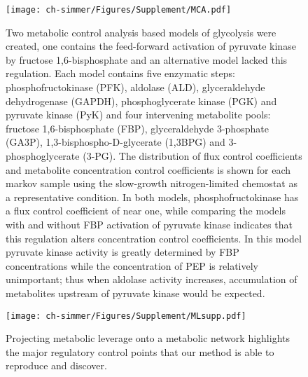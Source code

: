 \begin{figure}[!htb]
\texttt{[image: ch-simmer/Figures/Supplement/MCA.pdf]}
\caption[Two metabolic control analysis based models of glycolysis were created, one contains the feed-forward activation of pyruvate kinase by fructose 1,6-bisphosphate and an alternative model lacked this regulation]{Two metabolic control analysis based models of glycolysis were created, one contains the feed-forward activation of pyruvate kinase by fructose 1,6-bisphosphate and an alternative model lacked this regulation. Each model contains five enzymatic steps: phosphofructokinase (PFK), aldolase (ALD), glyceraldehyde dehydrogenase (GAPDH), phosphoglycerate kinase (PGK) and pyruvate kinase (PyK) and four intervening metabolite pools: fructose 1,6-bisphosphate (FBP), glyceraldehyde 3-phosphate (GA3P), 1,3-bisphospho-D-glycerate (1,3BPG) and 3-phosphoglycerate (3-PG). The distribution of flux control coefficients and metabolite concentration control coefficients is shown for each markov sample using the slow-growth nitrogen-limited chemostat as a representative condition.  In both models, phosphofructokinase has a flux control coefficient of near one, while comparing the models with and without FBP activation of pyruvate kinase indicates that this regulation alters concentration control coefficients. In this model pyruvate kinase activity is greatly determined by FBP concentrations while the concentration of PEP is relatively unimportant; thus when aldolase activity increases, accumulation of metabolites upstream of pyruvate kinase would be expected.}
\label{fig:MCA}
\end{figure}

\begin{figure}[H]
\texttt{[image: ch-simmer/Figures/Supplement/MLsupp.pdf]}
\caption{Projecting metabolic leverage onto a metabolic network highlights the major regulatory control points that our method is able to reproduce and discover.}
\label{fig:MLpathways}
\end{figure}

